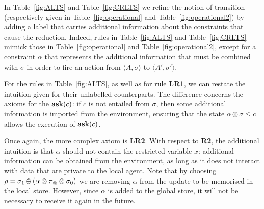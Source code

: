 \documentclass{llncs}
\newcommand{\ask}{{\bf ask}}
\def\odiv{\, {\ominus\hspace{-7.7pt} \div} \,}
\begin{document}
In Table~\ref{fig:ALTS} and Table~\ref{fig:CRLTS} we refine the notion of transition (respectively given in Table~\ref{fig:operational} and Table~\ref{fig:operational2})
by adding a label that carries additional information about the constraints that cause the reduction.
Indeed, rules in Table~\ref{fig:ALTS} and Table~\ref{fig:CRLTS} mimick those in Table~\ref{fig:operational} and Table~\ref{fig:operational2}, except for a constraint $\alpha$ that
represents the additional information that must be combined with $\sigma$ in order to fire an action
from $\langle A, \sigma\rangle$  to $\langle A', \sigma' \rangle$.

For the rules in Table~\ref{fig:ALTS}, as well as for rule {\bf  LR1}, we can restate the intuition given for their unlabelled counterparts. 
The difference concerns the axioms for the $\hbox{\ask}(c)$: if $c$ is not entailed from $\sigma$, then
some additional information  is imported from the environment, ensuring that the state
$\alpha \otimes \sigma \leq c$ allows the execution of $\hbox{\ask}(c)$.

Once again, the more complex axiom is {\bf LR2}. With respect to {\bf R2}, the additional intuition is that 
$\alpha$ should not contain the restricted variable $x$: additional information can be obtained from the environment,
as long as it does not interact with data that are private to the local agent.
%
Note that by choosing $\rho = \sigma_1 \odiv (\alpha \otimes \pi_\otimes  \otimes \sigma_0)$ we are 
removing $\alpha$ from the update to be memorised in the local store. However, 
since $\alpha$ is added to the global store, it will not be necessary to receive it again in the future. 
\end{document}
